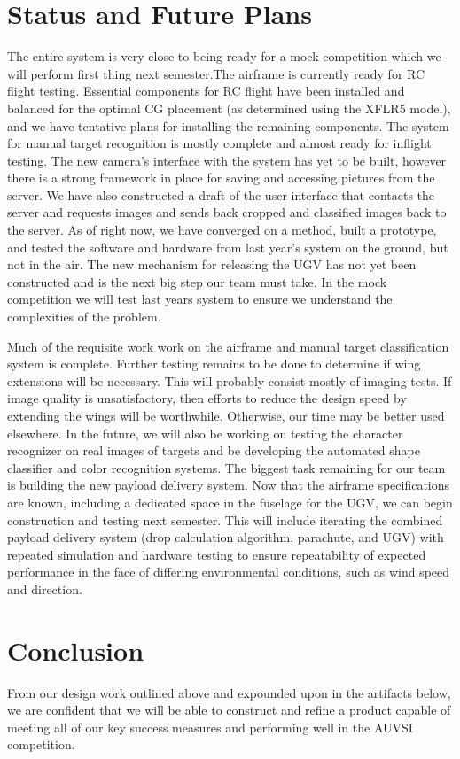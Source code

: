 \documentclass{auvsi_doc}
\begin{document}
\section{Status and Future Plans}
The entire system is very close to being ready for a mock competition which we will perform first thing next semester.The airframe is currently ready for RC flight testing. Essential components for RC flight have been installed and balanced for the optimal CG placement (as determined using the XFLR5 model), and we have tentative plans for installing the remaining components. The system for manual target recognition is mostly complete and almost ready for inflight testing. The new camera's interface with the system has yet to be built, however there is a strong framework in place for saving and accessing pictures from the server. We have also constructed a draft of the user interface that contacts the server and requests images and sends back cropped and classified images back to the server. As of right now, we have converged on a method, built a prototype, and tested the software and hardware from last year's system on the ground, but not in the air. The new mechanism for releasing the UGV has not yet been constructed and is the next big step our team must take. In the mock competition we will test last years system to ensure we understand the complexities of the problem. 

Much of the requisite work work on the airframe and manual target classification system is complete. Further testing remains to be done to determine if wing extensions will be necessary. This will probably consist mostly of imaging tests. If image quality is unsatisfactory, then efforts to reduce the design speed by extending the wings will be worthwhile. Otherwise, our time may be better used elsewhere. In the future, we will also be working on testing the character recognizer on real images of targets and be developing the automated shape classifier and color recognition systems. The biggest task remaining for our team is building the new payload delivery system. Now that the airframe specifications are known, including a dedicated space in the fuselage for the UGV, we can begin construction and testing next semester. This will include iterating the combined payload delivery system (drop calculation algorithm, parachute, and UGV) with repeated simulation and hardware testing to ensure repeatability of expected performance in the face of differing environmental conditions, such as wind speed and direction.

\section{Conclusion}
From our design work outlined above and expounded upon in the artifacts below, we are confident that we will be able to construct and refine a product capable of meeting all of our key success measures and performing well in the AUVSI competition.
\end{document}
